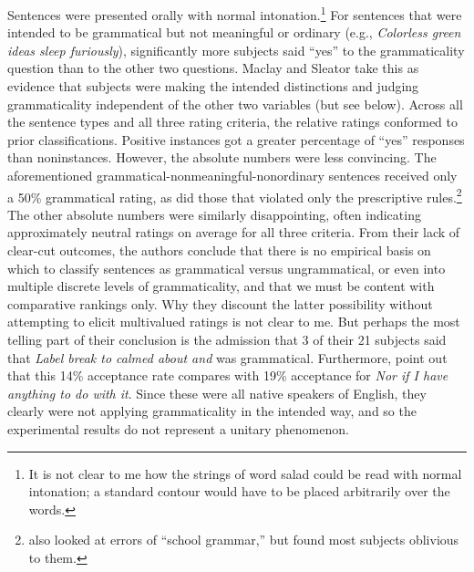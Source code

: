 Sentences were presented orally with normal  intonation.\footnote{It is not clear to me how the strings of word salad could be read with normal intonation; a standard contour would have to be placed arbitrarily over the words.}
For  sentences  that were intended to be grammatical but not meaningful or ordinary (e.g., \textit{Colorless green ideas sleep furiously}), significantly more subjects said ``yes'' to the grammaticality question than to the other two questions. Maclay and Sleator take this as evidence that subjects were making the intended distinctions and judging grammaticality independent of the other two variables (but see below). Across all the sentence types and all three rating criteria, the relative ratings conformed to prior classifications. Positive instances got a greater percentage of ``yes'' responses than noninstances. However, the absolute numbers were less convincing. The aforementioned grammatical-nonmeaningful-nonordinary sentences received only  a 50\% grammatical rating, as did those that violated only the prescriptive rules.\footnote{\citet{BradacEtAl1980} also looked at errors of ``school grammar,'' but found most subjects oblivious to them.}
 The other absolute numbers were similarly disappointing, often indicating approximately neutral ratings on average for all three criteria. From their lack of clear-cut outcomes, the authors conclude that there is no empirical basis on which to classify sentences as grammatical versus ungrammatical, or even into multiple discrete levels of grammaticality, and that we must be content with comparative rankings only. Why they discount the latter possibility without attempting to elicit multivalued ratings is not clear to me. But perhaps the most telling part of their conclusion is the admission that 3 of their 21 subjects said that \textit{Label  break  to calmed about and} was grammatical. Furthermore, \citet{QuirkEtAl1966} point
out that this 14\% acceptance rate compares with 19\% acceptance for \textit{Nor if I have anything to do with it}. Since these were all native speakers of English, they clearly were not applying grammaticality in the intended way, and so the experimental results do not represent a unitary phenomenon.

